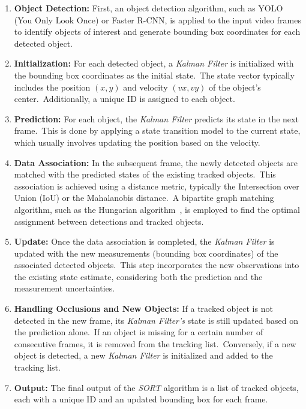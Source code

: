 \begin{enumerate}
    \item \textbf{Object Detection:} First, an object detection algorithm, such as YOLO (You Only Look Once) or Faster R-CNN, is applied to the input video frames to identify objects of interest and generate bounding box coordinates for each detected object.
    \item \textbf{Initialization:} For each detected object, a \textit{Kalman Filter} is initialized with the bounding box coordinates as the initial state.\ The state vector typically includes the position $(x, y)$ and velocity $(vx, vy)$ of the object's center.\ Additionally, a unique ID is assigned to each object.
    \item \textbf{Prediction:} For each object, the \textit{Kalman Filter} predicts its state in the next frame.\ This is done by applying a state transition model to the current state, which usually involves updating the position based on the velocity.
    \item \textbf{Data Association:} In the subsequent frame, the newly detected objects are matched with the predicted states of the existing tracked objects.\ This association is achieved using a distance metric, typically the Intersection over Union (IoU) or the Mahalanobis distance.\ A bipartite graph matching algorithm, such as the Hungarian algorithm~\cite{kuhn1955hungarian}, is employed to find the optimal assignment between detections and tracked objects.
    \item \textbf{Update:} Once the data association is completed, the \textit{Kalman Filter} is updated with the new measurements (bounding box coordinates) of the associated detected objects.\ This step incorporates the new observations into the existing state estimate, considering both the prediction and the measurement uncertainties.
    \item \textbf{Handling Occlusions and New Objects:} If a tracked object is not detected in the new frame, its \textit{Kalman Filter's} state is still updated based on the prediction alone.\ If an object is missing for a certain number of consecutive frames, it is removed from the tracking list.\ Conversely, if a new object is detected, a new \textit{Kalman Filter} is initialized and added to the tracking list.
    \item \textbf{Output:} The final output of the \textit{SORT} algorithm is a list of tracked objects, each with a unique ID and an updated bounding box for each frame.
\end{enumerate}

